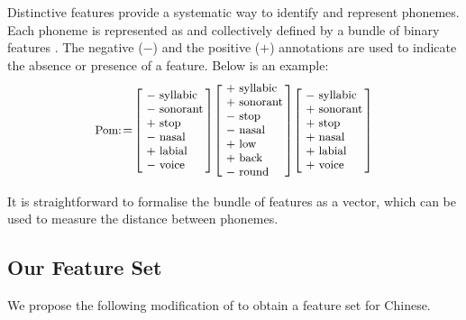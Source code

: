 Distinctive features provide a systematic way to identify and represent phonemes. 
Each phoneme is represented as and collectively defined by a bundle of binary features \citep[p.71]{hayes2011}. 
The negative ($-$) and the positive ($+$) annotations are used to indicate the absence or presence of a feature. 
Below is an example:
\begin{equation*} \label{pom}
\small
\text {Pom:}  \! =  \! \left[ \! \begin{array}{l}
- \text { syllabic} \\
- \text { sonorant} \\
+ \text { stop} \\
- \text { nasal} \\
+ \text { labial} \\
- \text { voice}
\end{array}  \! \! \right]  \! 
\left[  \! \begin{array}{l}
+ \text { syllabic} \\
+ \text { sonorant} \\
- \text { stop} \\
- \text { nasal} \\
+ \text { low} \\
+ \text { back} \\
- \text { round}
\end{array}  \! \! \right]  \! 
\left[ \! \begin{array}{l}
- \text { syllabic} \\
+ \text { sonorant} \\
+ \text { stop} \\
+ \text { nasal} \\
+ \text { labial} \\
+ \text { voice}
\end{array} \! \! \right] \end{equation*}

It is straightforward to formalise the bundle of features as a vector, which can be used to measure the distance between phonemes.

\subsection{Our Feature Set} \label{our-feature-set}

We propose the following modification of \citet{hayes2011} to obtain a feature set for Chinese.

